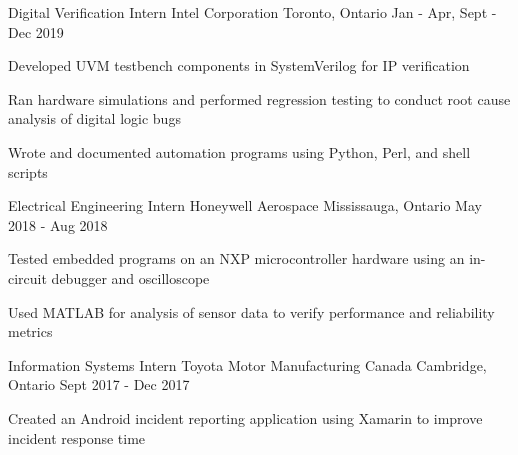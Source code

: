 

\begin{cventries}

  \cventry
    {Digital Verification Intern} %
    {Intel Corporation} %
    {Toronto, Ontario} %
    {Jan - Apr, Sept - Dec 2019} %
    {
      \begin{cvitems} %
        \item {Developed UVM testbench components in SystemVerilog for IP verification}
        \item {Ran hardware simulations and performed regression testing to conduct root cause analysis of digital logic bugs}
        \item {Wrote and documented automation programs using Python, Perl, and shell scripts}
      \end{cvitems}
    }

  \cventry
    {Electrical Engineering Intern} %
    {Honeywell Aerospace} %
    {Mississauga, Ontario} %
    {May 2018 - Aug 2018} %
    {
      \begin{cvitems} %
        \item {Tested embedded programs on an NXP microcontroller hardware using an in-circuit debugger and oscilloscope}
        \item {Used MATLAB for analysis of sensor data to verify performance and reliability metrics}
      \end{cvitems}
    }

  \cventry
    {Information Systems Intern} %
    {Toyota Motor Manufacturing Canada} %
    {Cambridge, Ontario} %
    {Sept 2017 - Dec 2017} %
    {
      \begin{cvitems} %
        \item {Created an Android incident reporting application using Xamarin to improve incident response time}
      \end{cvitems}
    }


\end{cventries}
